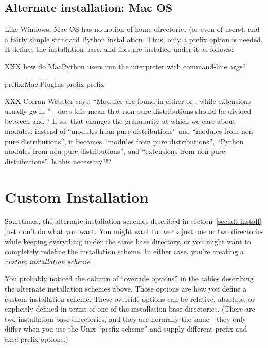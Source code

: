 \documentclass{howto}
\newcommand{\option}[1]{\textsf{\small{#1}}}
\begin{document}
\subsection{Alternate installation: Mac OS}
\label{sec:alt-macos}

Like Windows, Mac OS has no notion of home directories (or even of
users), and a fairly simple standard Python installation.  Thus, only a
\option{prefix} option is needed.  It defines the installation base, and 
files are installed under it as follows:

XXX how do MacPython users run the interpreter with command-line args?

              {prefix}{:Mac:PlugIns}
              {prefix}{}
              {prefix}{}

XXX Corran Webster says: ``Modules are found in either  or
, while extensions usually go in
''---does this mean that non-pure distributions should
be divided between  and ?  If so, that
changes the granularity at which we care about modules: instead of
``modules from pure distributions'' and ``modules from non-pure
distributions'', it becomes ``modules from pure distributions'',
``Python modules from non-pure distributions'', and ``extensions from
non-pure distributions''.  Is this necessary?!?


\section{Custom Installation}
\label{sec:custom-install}

Sometimes, the alternate installation schemes described in
section~\ref{sec:alt-install} just don't do what you want.  You might
want to tweak just one or two directories while keeping everything under
the same base directory, or you might want to completely redefine the
installation scheme.  In either case, you're creating a \emph{custom
  installation scheme}.

You probably noticed the column of ``override options'' in the tables
describing the alternate installation schemes above.  Those options are
how you define a custom installation scheme.  These override options can
be relative, absolute, or explicitly defined in terms of one of the
installation base directories.  (There are two installation base
directories, and they are normally the same---they only differ when you
use the Unix ``prefix scheme'' and supply different \option{prefix} and
\option{exec-prefix} options.)
\end{document}
